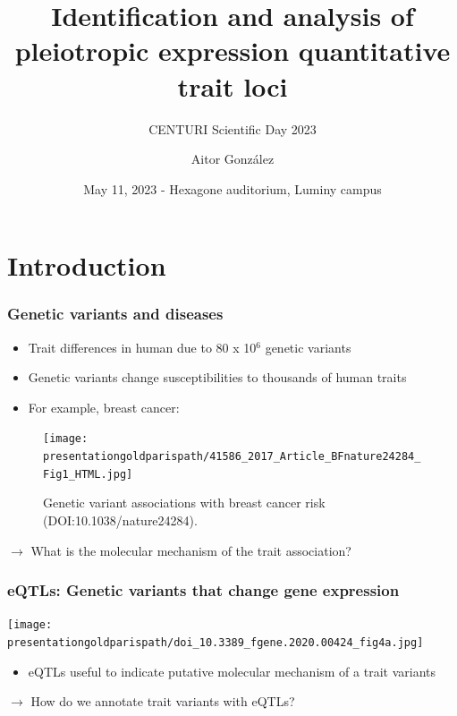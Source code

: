 \documentclass{beamer}
\title{Identification and analysis of pleiotropic expression quantitative trait loci}
\subtitle{CENTURI Scientific Day 2023}
\date{May 11, 2023 - Hexagone auditorium, Luminy campus}
\author{Aitor Gonz\'alez}
\institute{Aix Marseille Univ, INSERM, TAGC}
\newcommand*{\presentationgoldparispath}{../presentation_230120_gold2022_paris/fig/}%
\newcounter{frame}[frame]
\begin{document}
    \begin{frame}

        \titlepage

    \end{frame}


    \section{Introduction} %


    \begin{frame}
        \frametitle{Genetic variants and diseases}

        \begin{itemize}
            \item Trait differences in human due to 80 x 10$^6$ genetic variants
            \item Genetic variants change susceptibilities to thousands of human traits
            \item For example, breast cancer:
        \end{itemize}
        \begin{figure}
            \begin{center}
                \texttt{[image: \\presentationgoldparispath/41586\_2017\_Article\_BFnature24284\_Fig1\_HTML.jpg]}
            \end{center}
            \caption{Genetic variant associations with breast cancer risk (DOI:10.1038/nature24284).}
        \end{figure}

        $\rightarrow$ What is the molecular mechanism of the trait association?

    \end{frame}

    \begin{frame}
        \frametitle{eQTLs: Genetic variants that change gene expression}

        \texttt{[image: \\presentationgoldparispath/doi\_10.3389\_fgene.2020.00424\_fig4a.jpg]}

        \begin{itemize}
            \item eQTLs useful to indicate putative molecular mechanism of a trait variants
        \end{itemize}

        $\rightarrow$ How do we annotate trait variants with eQTLs?

        \let\thefootnote\relax{}
    \end{frame}
\end{document}
